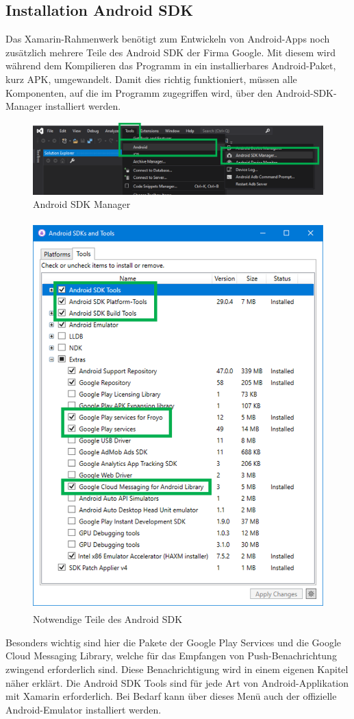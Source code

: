 \subsection{Installation Android SDK}
Das Xamarin-Rahmenwerk benötigt zum Entwickeln von Android-Apps noch zusätzlich mehrere Teile des Android SDK der Firma Google. Mit diesem wird während dem Kompilieren das Programm in ein installierbares Android-Paket, kurz APK, umgewandelt.
Damit dies richtig funktioniert, müssen alle Komponenten, auf die im Programm zugegriffen wird, über den Android-SDK-Manager installiert werden.
\begin{figure}[H]
    \centering\includegraphics[width=0.9\linewidth]{images/auswahl_rahmenwerk/android_sdk_installation.png}    
    \caption{Android SDK Manager}
\end{figure}
\begin{figure}[H]
    \centering\includegraphics[height=15cm]{images/auswahl_rahmenwerk/android_sdk_auswahl.png}    
    \caption{Notwendige Teile des Android SDK}
\end{figure}
Besonders wichtig sind hier die Pakete der Google Play Services und die Google Cloud Messaging Library, welche für das Empfangen von Push-Benachrichtung zwingend erforderlich sind. Diese Benachrichtigung wird in einem eigenen Kapitel näher erklärt.
Die Android SDK Tools sind für jede Art von Android-Applikation mit Xamarin erforderlich.
Bei Bedarf kann über dieses Menü auch der offizielle Android-Emulator installiert werden.

